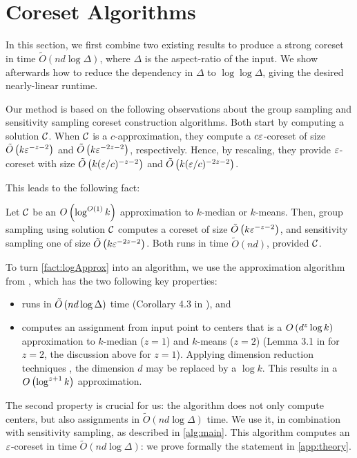 \section{Coreset Algorithms}
\label{sec:theory}

In this section, we first combine two existing results to produce a strong coreset in time $\tilde{O}(nd \log \Delta)$, where $\Delta$ is the aspect-ratio of
the input.  We show afterwards how to reduce the dependency in $\Delta$ to $\log \log \Delta$, giving the desired nearly-linear runtime.

Our method is based on the following observations about the group sampling \cite{stoc21} and sensitivity sampling \cite{FeldmanL11} coreset construction
algorithms. Both start by computing a solution $\mathcal C$. When $\mathcal C$ is a $c$-approximation, they compute a $c \varepsilon$-coreset of size $\tilde O\left(
k \varepsilon^{-z-2}\right)$ and $\tilde O\left( k \varepsilon^{-2z -2}\right)$, respectively. Hence, by rescaling, they provide $\varepsilon$-coreset with size $\tilde O\left(
k (\varepsilon/c)^{-z-2}\right)$ and $\tilde O\left( k (\varepsilon/c)^{-2z-2}\right)$. 

This leads to the following fact:
\begin{fact}\label{fact:logApprox}
Let $\mathcal C$ be an $O\left( \log^{O(1)} k\right)$ approximation to $k$-median or $k$-means.
Then, group sampling using solution $\mathcal C$ computes a coreset of size $\tilde O\left(
k \varepsilon^{-z-2}\right)$, and sensitivity sampling one of size $\tilde O\left( k \varepsilon^{-2z-2}\right)$. 
Both runs in time $\tilde O(nd)$, provided $\mathcal C$.
\end{fact}

To turn \cref{fact:logApprox} into an algorithm, we use the \fkmeans approximation algorithm from \cite{cohen2020fast}, which has the two following key properties: 
\begin{itemize}
\item \fkmeans runs in $\tilde O\left( n d \log \Delta\right)$ time (Corollary 4.3 in \cite{cohen2020fast}), and
\item \fkmeans computes an assignment from input point to centers that is a $O\left( d^z \log k\right)$ approximation to $k$-median ($z=1$) and
$k$-means ($z=2$) (Lemma 3.1 in \cite{cohen2020fast} for $z=2$, the discussion above for $z=1$). Applying dimension reduction techniques \cite{MakarychevMR19}, the dimension $d$ may be replaced by a $\log k$. This results in a $O\left(\log^{z+1} k\right)$ approximation.
\end{itemize}

The second property is crucial for us: the algorithm does not only compute centers, but also assignments in $\tilde{O}(nd\log \Delta)$ time.  We use it, in
combination with sensitivity sampling, as described in \cref{alg:main}.  This algorithm computes an $\varepsilon$-coreset in time $\tilde O(nd \log \Delta)$: we prove
formally the statement in \cref{app:theory}.

